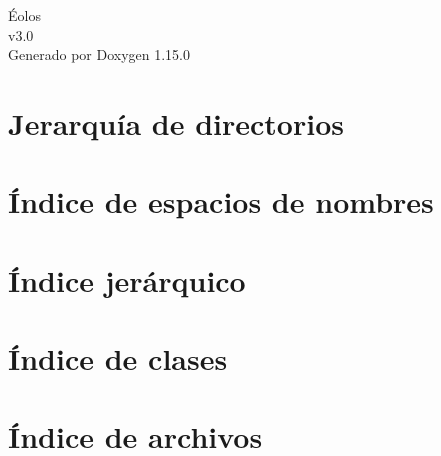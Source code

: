\documentclass[twoside]{book}
\newcommand{\+}{\discretionary{\mbox{\scriptsize$\hookleftarrow$}}{}{}}
\newcommand{\clearemptydoublepage}{%
    \newpage{\pagestyle{empty}\cleardoublepage}%
  }
\begin{document}
  \raggedbottom
    \hypersetup{pageanchor=false,
                bookmarksnumbered=true,
                pdfencoding=unicode
               }
  \begin{titlepage}
  \vspace*{7cm}
  \begin{center}%
  {\Large Éolos}\\
  [1ex]\large v3.\+0 \\
  \vspace*{1cm}
  {\large Generado por Doxygen 1.15.0}\\
  \end{center}
  \end{titlepage}
  \clearemptydoublepage
  \tableofcontents
  \clearemptydoublepage
  \hypersetup{pageanchor=true}
\chapter{Jerarquía de directorios}

\chapter{Índice de espacios de nombres}

\chapter{Índice jerárquico}

\chapter{Índice de clases}

\chapter{Índice de archivos}

\end{document}
